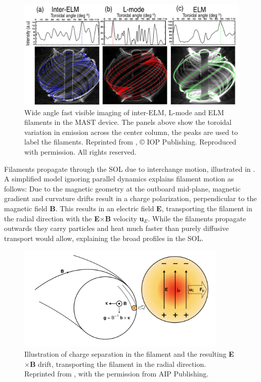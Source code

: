 \begin{figure}[t]
	\centering
	\includegraphics[width=13cm]{figures/ayed_mast.png}
	\caption{Wide angle fast visible imaging of inter-ELM, L-mode and ELM
		filaments in the MAST device. The panels above show the toroidal variation in emission across
		the center column, the peaks are used to label the filaments. Reprinted from \cite{ayed2009inter}, © IOP Publishing.  Reproduced with permission.  All rights reserved.}
	\label{Fig:ayed}
\end{figure}
Filaments propagate through the SOL due to interchange motion, illustrated in . A simplified model ignoring parallel dynamics explains filament motion as follows: Due to the magnetic geometry at the outboard mid-plane, magnetic gradient and curvature drifts result in a charge polarization, perpendicular to the magnetic field \textbf{B}. This results in an electric field \textbf{E}, transporting the filament in the radial direction with the \textbf{E}$\times$\textbf{B} velocity \textbf{u}$_E$. While the filaments propagate outwards they carry particles and heat much faster than purely diffusive transport would allow, explaining the broad profiles in the SOL.
\begin{figure}[t]
	\centering
	\includegraphics[width=10cm]{figures/xu.png}
	\caption{Illustration of charge separation in the filament and the resulting \textbf{E}$\times$\textbf{B} drift, transporting the filament in the radial direction. Reprinted from \cite{xu2010intermittent}, with the permission from AIP Publishing.}
	\label{Fig:xu}
\end{figure}
